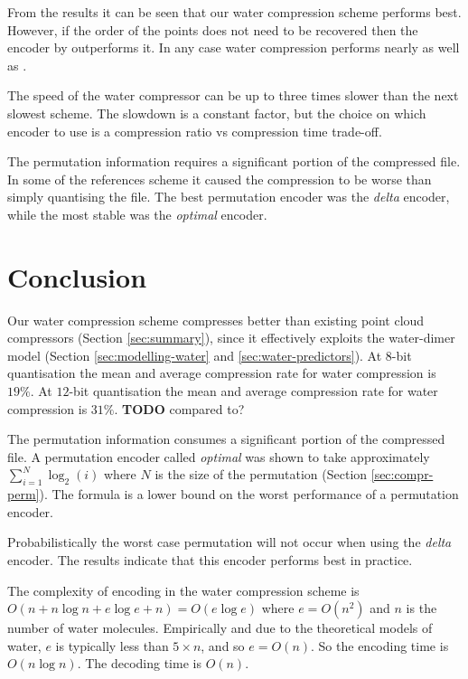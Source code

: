 \documentclass[a4paper]{report}
\newcommand{\todo}{\textbf{TODO} }
\begin{document}
From the results it can be seen that our water compression scheme performs
best. However, if the order of the points does not need to be recovered then
the encoder by \citet{gumholdcomp} outperforms it. In any case water
compression performs nearly as well as \citet{gumholdcomp}.

The speed of the water compressor can be up to three times slower than the
next slowest scheme. The slowdown is a constant factor, but the choice on
which encoder to use is a compression ratio vs compression time trade-off.

The permutation information requires a significant portion of the compressed
file. In some of the references scheme it caused the compression to be worse
than simply quantising the file. The best permutation encoder was the
\emph{delta} encoder, while the most stable was the \emph{optimal} encoder.



\chapter{Conclusion}

Our water compression scheme compresses better than existing point cloud
compressors (Section \ref{sec:summary}), since it effectively exploits the
water-dimer model (Section \ref{sec:modelling-water} and
\ref{sec:water-predictors}). At $8$-bit quantisation the mean and average
compression rate for water compression is $19\%$. At $12$-bit quantisation the
mean and average compression rate for water compression is $31\%$. \todo
compared to?

The permutation information consumes a significant portion of the compressed
file. A permutation encoder called \emph{optimal} was shown to take
approximately $\sum^{N}_{i=1} \log_2(i)$ where $N$ is the size of the
permutation (Section \ref{sec:compr-perm}). The formula is a lower bound on
the worst performance of a permutation encoder.

Probabilistically the worst case permutation will not occur when using the
\emph{delta} encoder. The results indicate that this encoder performs best in
practice.

The complexity of encoding in the water compression scheme is $O(n + n \log n
+ e \log e + n) = O(e \log e)$ where $e = O(n^2)$ and $n$ is the number of
water molecules. Empirically and due to the theoretical models of water, $e$
is typically less than $5 \times n$, and so $e = O(n)$. So the encoding time
is $O(n \log n)$. The decoding time is $O(n)$.
\end{document}

